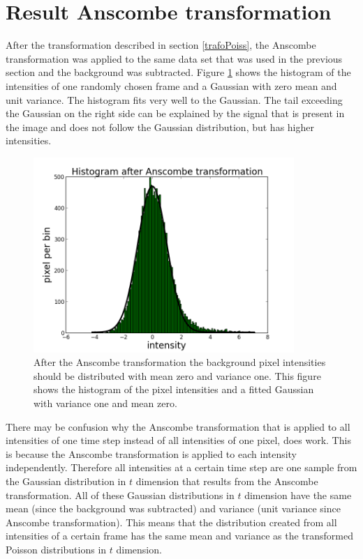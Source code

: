 \section{Result Anscombe transformation}
After the transformation described in section \ref{trafoPoiss}, the Anscombe transformation was applied to the same data set that was used in the previous section and the background was subtracted. Figure \ref{isitAnscombe} shows the histogram of the intensities of one randomly chosen frame and a Gaussian with zero mean and unit variance. The histogram fits very well to the Gaussian. The tail exceeding the Gaussian on the right side can be explained by the signal that is present in the image and does not follow the Gaussian distribution, but has higher intensities.\newline
\begin{figure}
\centering
\includegraphics[width = 0.88\textwidth]{pictures/anscombeAndFit.png}
	 \caption{After the Anscombe transformation the background pixel intensities should be distributed with mean zero and variance one. This figure shows the histogram of the pixel intensities and a fitted Gaussian with variance one and mean zero.}
	\label{isitAnscombe}
\end{figure}
There may be confusion why the Anscombe transformation that is applied to all intensities of one time step instead of all intensities of one pixel, does work. This is because the Anscombe transformation is applied to each intensity independently. Therefore all intensities at a certain time step are one sample from the Gaussian distribution in $t$ dimension that results from the Anscombe transformation. All of these Gaussian distributions in $t$ dimension have the same mean (since the background was subtracted) and variance (unit variance since Anscombe transformation). This means that the distribution created from all intensities of a certain frame has the same mean and variance as the transformed Poisson distributions in $t$ dimension.
